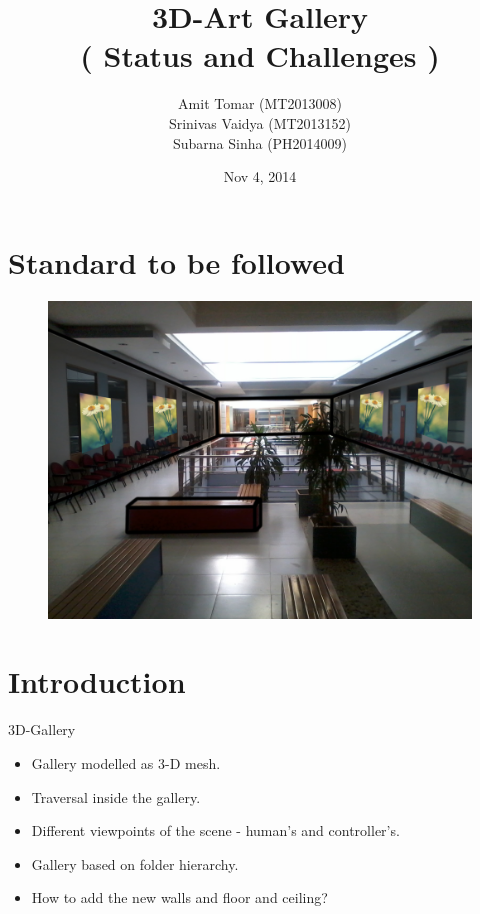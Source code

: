 \documentclass[color=usenames,dvipsnames]{beamer}
\title{3D-Art Gallery\\ ( Status and Challenges )}
\author[]{Amit Tomar (MT2013008) \\Srinivas Vaidya  (MT2013152)\\ Subarna Sinha  (PH2014009) }
\institute[IIIT-Bangalore]{International Institute of Information Technology, Bangalore}
\date{Nov 4, 2014}
\begin{document}
\begin{frame}
  \titlepage
\end{frame}



\section{Standard to be followed}

\begin{frame}{}

\begin{figure}[h!]  
  \centering
  \includegraphics[width=1\textwidth]{3D-ArtGallery.jpg}  
  \end{figure} 
\end{frame}

\section{Introduction}

\begin{frame}{3D-Gallery}

\begin{itemize}

  \setlength{\itemsep}{25pt}
  
\item Gallery modelled as 3-D mesh.

\item Traversal inside the gallery.
  
\item Different viewpoints of the scene - human's and controller's.
  
\item Gallery based on folder hierarchy.

\item How to add the new walls and floor and ceiling?

\end{itemize}
\end{frame}
\end{document}
